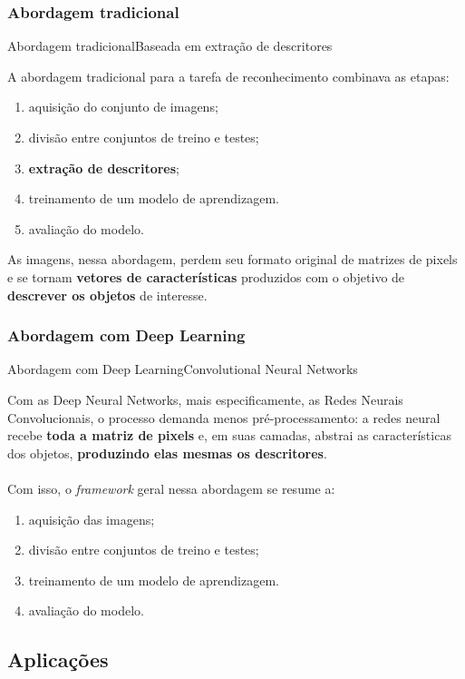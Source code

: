 \documentclass{beamer}
\begin{document}
    \subsubsection{Abordagem tradicional}
    \begin{frame}{Abordagem tradicional}{Baseada em extração de descritores}

        A abordagem tradicional para a tarefa de reconhecimento 
        combinava as etapas:
            \begin{enumerate}
                \item aquisição do conjunto de imagens;
                \item divisão entre conjuntos de treino e testes;
                \item \textbf{extração de descritores};
                \item treinamento de um modelo de aprendizagem.
                \item avaliação do modelo.
            \end{enumerate}

        As imagens, nessa abordagem, perdem seu
        formato original de matrizes de pixels
        e se tornam \textbf{vetores de características}
        produzidos com o objetivo de \textbf{descrever
        os objetos} de interesse.
    \end{frame}

    \subsubsection{Abordagem com Deep Learning}
    \begin{frame}{Abordagem com Deep Learning}{Convolutional Neural Networks}
        
        Com as Deep Neural Networks, mais especificamente,
        as Redes Neurais Convolucionais, o processo demanda menos
        pré-processamento: a redes neural
        recebe \textbf{toda a matriz de pixels}
        e, em suas camadas, abstrai as características
        dos objetos, \textbf{produzindo elas mesmas os descritores}.
        \\~\\
        Com isso, o \emph{framework} geral nessa abordagem 
        se resume a:
        \begin{enumerate}
            \item aquisição das imagens;
            \item divisão entre conjuntos de treino e testes;
            \item treinamento de um modelo de aprendizagem.
            \item avaliação do modelo.
        \end{enumerate}
   
    \end{frame}

    \subsection{Aplicações}
    
\end{document}
